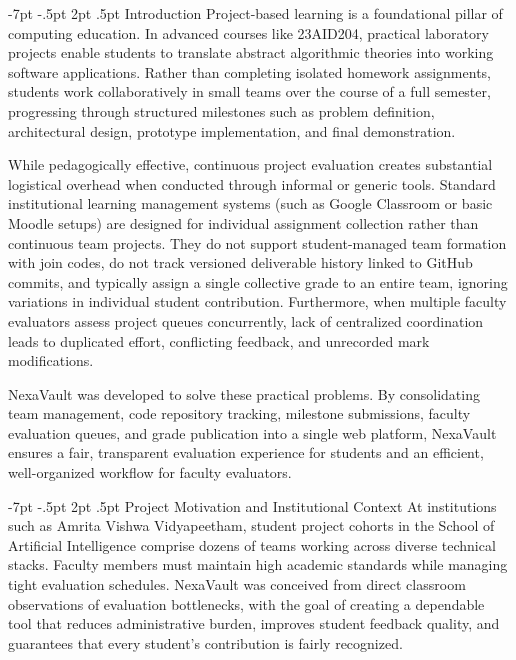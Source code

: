 \documentclass[11pt,a4paper]{article}
\makeatletter
\renewcommand\section{\@startsection {section}{1}{\z@}%
  {-7pt \@plus -1.5pt \@minus -.5pt}%
  {2pt \@plus .5pt}%
  {\normalfont\large\bfseries\color{nexaNavy}}}
\makeatother
\begin{document}
\section{Introduction}
Project-based learning is a foundational pillar of computing education. In advanced courses like 23AID204, practical laboratory projects enable students to translate abstract algorithmic theories into working software applications. Rather than completing isolated homework assignments, students work collaboratively in small teams over the course of a full semester, progressing through structured milestones such as problem definition, architectural design, prototype implementation, and final demonstration.

While pedagogically effective, continuous project evaluation creates substantial logistical overhead when conducted through informal or generic tools. Standard institutional learning management systems (such as Google Classroom or basic Moodle setups) are designed for individual assignment collection rather than continuous team projects. They do not support student-managed team formation with join codes, do not track versioned deliverable history linked to GitHub commits, and typically assign a single collective grade to an entire team, ignoring variations in individual student contribution. Furthermore, when multiple faculty evaluators assess project queues concurrently, lack of centralized coordination leads to duplicated effort, conflicting feedback, and unrecorded mark modifications.

NexaVault was developed to solve these practical problems. By consolidating team management, code repository tracking, milestone submissions, faculty evaluation queues, and grade publication into a single web platform, NexaVault ensures a fair, transparent evaluation experience for students and an efficient, well-organized workflow for faculty evaluators.

\section{Project Motivation and Institutional Context}
At institutions such as Amrita Vishwa Vidyapeetham, student project cohorts in the School of Artificial Intelligence comprise dozens of teams working across diverse technical stacks. Faculty members must maintain high academic standards while managing tight evaluation schedules. NexaVault was conceived from direct classroom observations of evaluation bottlenecks, with the goal of creating a dependable tool that reduces administrative burden, improves student feedback quality, and guarantees that every student's contribution is fairly recognized.
\end{document}
